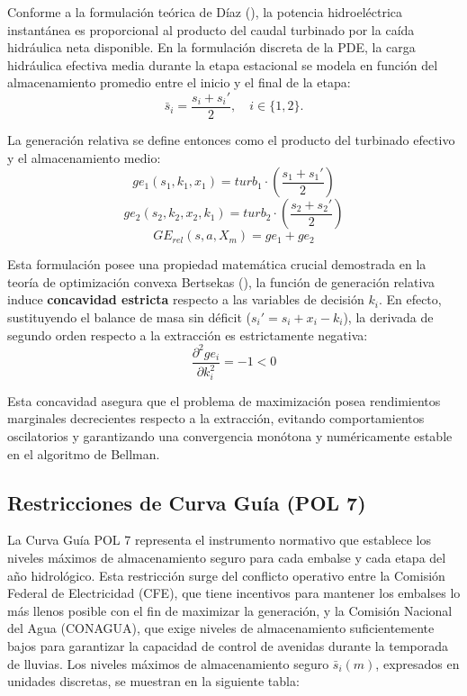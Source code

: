 \documentclass[
  spanish,
  letterpaper,
]{scrreprt}
\theoremstyle{definition}
\theoremstyle{remark}
\begin{document}
Conforme a la formulación teórica de Díaz
(), la potencia hidroeléctrica
instantánea es proporcional al producto del caudal turbinado por la
caída hidráulica neta disponible. En la formulación discreta de la PDE,
la carga hidráulica efectiva media durante la etapa estacional se modela
en función del almacenamiento promedio entre el inicio y el final de la
etapa: \[\bar{s}_i = \frac{s_i + s_{i}'}{2}, \quad i \in \{1, 2\}.\]

La generación relativa se define entonces como el producto del turbinado
efectivo y el almacenamiento medio:
\[ge_1(s_1, k_1, x_1) = turb_1 \cdot \left( \frac{s_1 + s_{1}'}{2} \right)\]
\[ge_2(s_2, k_2, x_2, k_1) = turb_2 \cdot \left( \frac{s_2 + s_{2}'}{2} \right)\]
\[GE_{rel}(s, a, X_m) = ge_1 + ge_2\]

Esta formulación posee una propiedad matemática crucial demostrada en la
teoría de optimización convexa Bertsekas
(), la función de generación relativa
induce \textbf{concavidad estricta} respecto a las variables de decisión
\(k_i\). En efecto, sustituyendo el balance de masa sin déficit
(\(s_{i}' = s_i + x_i - k_i\)), la derivada de segundo orden respecto a
la extracción es estrictamente negativa:
\[\frac{\partial^2 ge_i}{\partial k_i^2} = -1 < 0\]

Esta concavidad asegura que el problema de maximización posea
rendimientos marginales decrecientes respecto a la extracción, evitando
comportamientos oscilatorios y garantizando una convergencia monótona y
numéricamente estable en el algoritmo de Bellman.

\subsection{Restricciones de Curva Guía (POL
7)}\label{restricciones-de-curva-guuxeda-pol-7}

La Curva Guía POL 7 representa el instrumento normativo que establece
los niveles máximos de almacenamiento seguro para cada embalse y cada
etapa del año hidrológico. Esta restricción surge del conflicto
operativo entre la Comisión Federal de Electricidad (CFE), que tiene
incentivos para mantener los embalses lo más llenos posible con el fin
de maximizar la generación, y la Comisión Nacional del Agua (CONAGUA),
que exige niveles de almacenamiento suficientemente bajos para
garantizar la capacidad de control de avenidas durante la temporada de
lluvias. Los niveles máximos de almacenamiento seguro \(\bar{s}_i(m)\),
expresados en unidades discretas, se muestran en la siguiente tabla:
\end{document}
